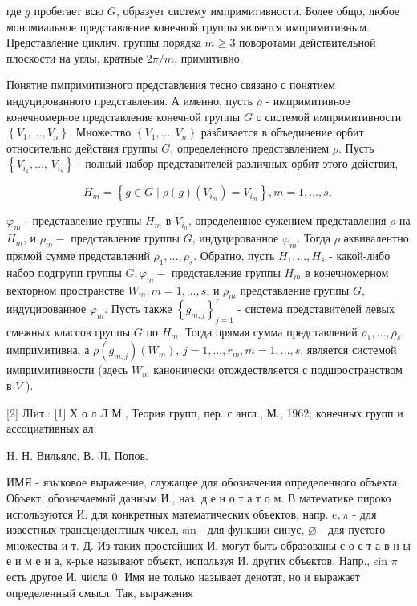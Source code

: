 \documentclass[10pt]{article}
\begin{document}
где $g$ пробегает всю $G$, образует систему импримитивности. Более общо, любое мономиальное представление конечной группы является импримитивным. Представление циклич. группы порядка $m \geqslant 3$ поворотами действительной плоскости на углы, кратные $2 \pi / m$, примитивно.



Понятие пмпримитивного представления тесно связано с понятием индуцированного представления. А именно, пусть $\rho$ - импримитивное конечномерное представление конечной группы $G$ с системой импримитивности $\left\{V_{1}, \ldots, V_{n}\right\}$. Множество $\left\{V_{1}, \ldots, V_{n}\right\}$ разбивается в объединение орбит относительно действия группы $G$, определенного представлением $\rho$. Пусть $\left\{V_{i_{1}}, \ldots\right.$, $\left.V_{i_{s}}\right\}$ - полный набор представителей различных орбит этого действия,



\[

H_{m}=\left\{g \in G \mid \rho(g)\left(V_{i_{m}}\right)=V_{i_{m}}\right\}, m=1, \ldots, s,

\]



$\varphi_{m}$ - представление группы $H_{m}$ в $V_{i_{n}}$, определенное сужением представления $\rho$ на $H_{m}$, и $\rho_{m}-$ представление группы $G$, индуцированное $\varphi_{m}$. Тогда $\rho$ әквивалентно прямой сумме представлений $\rho_{1}, \ldots, \rho_{s}$. Обратно, пусть $H_{1}, \ldots, H_{s}$ - какой-либо набор подгрупп группы $G, \varphi_{m}-$ представление группы $H_{m}$ в конечномерном векторном пространстве $W_{m}, m=1, \ldots, s$, и $\rho_{m}$ представление группы $G$, индуцированное $\varphi_{m}$. Пусть также $\left\{g_{m, j}\right\}_{j=1}^{r}$ - система представителей левых смежных классов группы $G$ по $H_{m}$. Тогда прямая сумма представлений $\rho_{1}, \ldots, \rho_{s}$ импримитивна, а $\rho\left(g_{m, j}\right)\left(W_{m}\right)$, $j=1, \ldots, r_{m}, m=1, \ldots, s$, является системой импримитивности (здесь $W_{m}$ канонически отождествляется с подшространством в $V$ ).



[2] ЛІит.: [1] Х о л Л М., Теория групп, пер. с англ., М., 1962; конечных групп и ассоциативных ал



H. Н. Вильялс, В. JI. Попов.



ИМЯ - языковое выражение, служащее для обозначения определенного объекта. Объект, обозначаемый данным И., наз. д е н о т а т о м. В математике пироко используются И. для конкретных математических объектов, напр. $e, \pi$ - для известных трансцендентных чисел, sin - для функции синус, $\varnothing$ - для пустого множества и т. Д. Из таких простейших И. могут быть образованы с о с т а в н ы е и м е н а, к-рые называют объект, используя И. других объектов. Напр., sin $\pi$ есть другое И. числа 0. Имя не только называет денотат, но и выражает определенный смысл. Так, выражения
\end{document}
